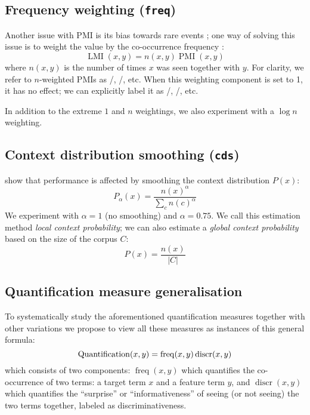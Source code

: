 \subsection{Frequency weighting (\texttt{freq})}
\label{sec:frequency-weighting}

Another issue with PMI is its bias towards rare events \cite{TACL570}; one way of solving this issue is to weight the value by the co-occurrence frequency \cite{Evert05}:
%
\begin{equation}
  \label{eq:lmi}
  \operatorname{LMI}(x, y) = n(x, y)\operatorname{PMI}(x, y)
\end{equation}
%
where $n(x, y)$ is the number of times $x$ was seen together with $y$. For clarity, we refer to $n$-weighted PMIs as \NPMI/, \NSPMI/, etc. When this weighting component is set to 1, it has no effect; we can  explicitly label it as \PMI/, \SPMI/, etc.

In addition to the extreme $1$ and $n$ weightings, we also experiment with a $\log n$ weighting.

\subsection{Context distribution smoothing (\texttt{cds})}
\label{sec:cont-distr-smooth}

 show that performance is affected by smoothing the context distribution $P(x)$:
%
\begin{equation}
  \label{eq:cds}
  P_{\alpha}(x) = \frac{n(x)^{\alpha}}{\sum_{c}n(c)^{\alpha}}
\end{equation}
%
We experiment with $\alpha=1$ (no smoothing) and $\alpha = 0.75$. We call this estimation method \emph{local context probability}; we can also estimate a \emph{global context probability} based on the size of the corpus $C$:
%
\begin{equation}
  \label{eq:cds-nan}
  P(x) = \frac{n(x)}{|C|}
\end{equation}

\subsection{Quantification measure generalisation}
\label{sec:quantification-measures}

To systematically study the aforementioned quantification measures together with other variations we propose to view all these measures as instances of this general formula:
%
\begin{equation}
  \small
  \label{eq:association}
  \operatorname{Quantification}(x,y) = \operatorname{freq}(x, y)
                                       \operatorname{discr}(x, y)
\end{equation}
%
which consists of two components: $\operatorname{freq}(x, y)$ which quantifies the co-occurrence of two terms: a target term $x$ and a feature term $y$, and $\operatorname{discr}(x, y)$ which quantifies the ``surprise'' or ``informativeness'' of seeing (or not seeing) the two terms together,  labeled as discriminativeness.

